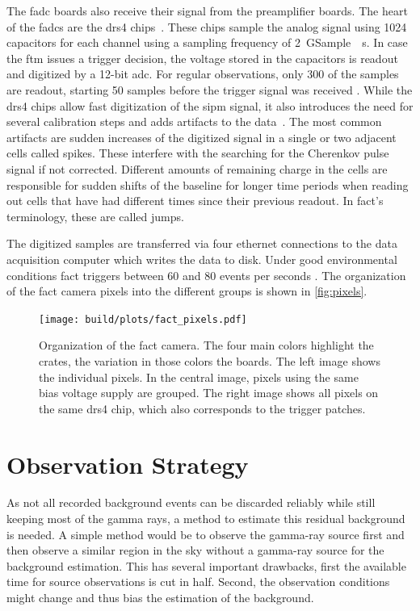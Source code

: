 The \gls{fadc} boards also receive their signal from the preamplifier boards.
The heart of the \glspl{fadc} are the \gls{drs4} chips~\cite{drs4}. 
These chips sample the analog signal using 1024 capacitors for each channel using
a sampling frequency of \SI{2}{\giga Sample \per \second}.
In case the \gls{ftm} issues a trigger decision, the voltage stored in the capacitors
is readout and digitized by a 12-bit \gls{adc}.
For regular observations, only 300 of the samples are readout, starting 50 samples
before the trigger signal was received \cite{fact-design-operation}.
While the \gls{drs4} chips allow fast digitization of the \gls{sipm} signal,
it also introduces the need for several calibration steps
and adds artifacts to the data~\cite{magic-drs4}.
The most common artifacts are sudden increases of the digitized signal in a single
or two adjacent cells called spikes.
These interfere with the searching for the Cherenkov pulse signal if not corrected.
Different amounts of remaining charge in the cells are responsible for sudden shifts of the baseline
for longer time periods when reading out cells that have had different times since their previous readout.
In \gls{fact}'s terminology, these are called jumps.

The digitized samples are transferred via four ethernet connections to the data acquisition computer which writes the data to disk. 
Under good environmental conditions \gls{fact} triggers between 60 and 80 events per seconds
\cite{fact-sipm-performance,fact-design-operation}.
The organization of the \gls{fact} camera pixels into the different groups is shown in
\autoref{fig:pixels}.

\begin{figure}
  \centering
  \texttt{[image: build/plots/fact\_pixels.pdf]}
  \caption{%
    Organization of the \gls{fact} camera.
    The four main colors highlight the crates, the variation in those colors the 
    boards.
    The left image shows the individual pixels.
    In the central image, pixels using the same bias voltage supply are grouped.
    The right image shows all pixels on the same \gls{drs4} chip, which also corresponds
    to the trigger patches.
  }\label{fig:pixels}
\end{figure}

\section{Observation Strategy}\label{sec:wobble}

As not all recorded background events can be discarded reliably while still
keeping most of the gamma rays, a method to estimate this residual background is needed.
A simple method would be to observe the gamma-ray source first and then 
observe a similar region in the sky without a gamma-ray source for the background estimation.
This has several important drawbacks,
first the available time for source observations is cut in half.
Second, the observation conditions might change and thus bias the estimation of the background.

